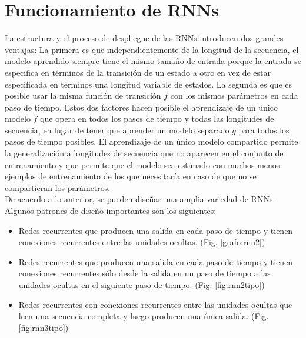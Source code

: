         
        


    \section{Funcionamiento de RNNs}
        
    La estructura y el proceso de despliegue de las RNNs introducen dos grandes ventajas: La primera es que independientemente de la longitud de la secuencia, el modelo aprendido siempre tiene el mismo tamaño de entrada porque la entrada se especifica en términos de la transición de un estado a otro en vez de estar especificada en términos una longitud variable de estados. La segunda es que es posible usar la misma función de transición $f$ con los mismos parámetros en cada paso de tiempo. Estos dos factores hacen posible el aprendizaje de un único modelo $f$ que opera en todos los pasos de tiempo y todas las longitudes de secuencia, en lugar de tener que aprender un modelo separado $g$ para todos los pasos de tiempo posibles. El aprendizaje de un único modelo compartido permite la generalización a longitudes de secuencia que no aparecen en el conjunto de entrenamiento y que permite que el modelo sea estimado con muchos menos ejemplos de entrenamiento de los que necesitaría en caso de que no se compartieran los parámetros. \\
        
    De acuerdo a lo anterior, se pueden diseñar una amplia variedad de RNNs. Algunos patrones de diseño importantes son los siguientes: 
        
            \begin{itemize}
                \item Redes recurrentes que producen una salida en cada paso de tiempo y tienen conexiones recurrentes entre las unidades ocultas. (Fig. \ref{grafo:rnn2})
                
                \item Redes recurrentes que producen una salida en cada paso de tiempo y tienen conexiones recurrentes sólo desde la salida en un paso de tiempo a las unidades ocultas en el siguiente paso de tiempo. (Fig. \ref{fig:rnn2tipo})
                
                \item Redes recurrentes con conexiones recurrentes entre las unidades ocultas que leen una secuencia completa y luego producen una única salida. (Fig. \ref{fig:rnn3tipo})
            \end{itemize}
            
